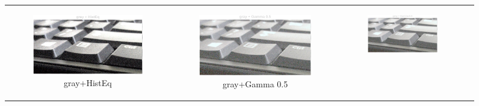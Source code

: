 \documentclass[11pt, a4]{article}
\begin{document}
\begin{enumerate}
\begin{figure}[H]
{					\begin{tabular}{cccc}
						\begin{subfigure}[h]{0.45\linewidth}
							\centering
							\includegraphics[width=\linewidth]{../output/RawImage2_Tone_gray_HistEq.pdf}
							\caption{gray+HistEq}
							\label{fig:RawImage2_tone_1}
						\end{subfigure} &
						\begin{subfigure}[h]{0.45\linewidth}
							\centering
							\includegraphics[width=\linewidth]{../output/RawImage2_Tone_gray_Gamma0.5.pdf}
							\caption{gray+Gamma 0.5}
							\label{fig:RawImage2_tone_2}
						\end{subfigure} &
						\begin{subfigure}[h]{0.45\linewidth}
							\centering
							\includegraphics[width=\linewidth]{../output/RawImage2_Tone_gray_Gamma0.5.pdf}

\end{subfigure}
\end{tabular}}
\end{figure}
\end{enumerate}
\end{document}
